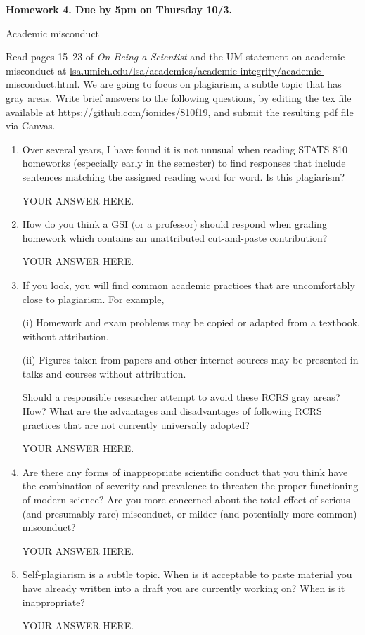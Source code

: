 \documentclass[12pt]{article}
\begin{document}
\begin{center}\bf
Homework 4. Due by 5pm on Thursday 10/3.

Academic misconduct

\end{center}
Read pages 15--23 of {\em On Being a Scientist} and the UM statement on academic misconduct at \url{lsa.umich.edu/lsa/academics/academic-integrity/academic-misconduct.html}. We are going to focus on plagiarism, a subtle topic that has gray areas.
Write brief answers to the following questions, by editing the tex file available at \url{https://github.com/ionides/810f19}, and submit the resulting pdf file via Canvas. 

\begin{enumerate}

\item Over several years, I have found it is not unusual when reading STATS 810 homeworks (especially early in the semester) to find responses that include sentences matching the assigned reading word for word. Is this plagiarism?

YOUR ANSWER HERE.

\item How do you think a GSI (or a professor) should respond when grading homework which contains an unattributed cut-and-paste contribution?

YOUR ANSWER HERE.

\item If you look, you will find common academic practices that are uncomfortably close to plagiarism. For example,

(i) Homework and exam problems may be copied or adapted from a textbook, without attribution.

(ii) Figures taken from papers and other internet sources may be presented in talks and courses without attribution.

Should a responsible researcher attempt to avoid these RCRS gray areas? How? What are the advantages and disadvantages of following RCRS practices that are not currently universally adopted?

YOUR ANSWER HERE.

\item Are there any forms of inappropriate scientific conduct that you think have the combination of severity and prevalence to threaten the proper functioning of modern science? Are you more concerned about the total effect of serious (and presumably rare) misconduct, or milder (and potentially more common) misconduct?

YOUR ANSWER HERE.

\item Self-plagiarism is a subtle topic. When is it acceptable to paste material you have already written into a draft you are currently working on? When is it inappropriate?

YOUR ANSWER HERE.

\end{enumerate}
\end{document}
